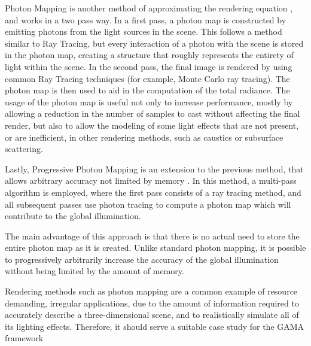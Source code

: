 Photon Mapping is another method of approximating the rendering equation \cite{jensen1996global}, and works in a two pass way.
In a first pass, a photon map is constructed by emitting photons from the light sources in the scene. This follows a method similar to Ray Tracing, but every interaction of a photon with the scene is stored in the photon map, creating a structure that roughly represents the entirety of light within the scene.
In the second pass, the final image is rendered by using common Ray Tracing techniques (for example, Monte Carlo ray tracing). The photon map is then used to aid in the computation of the total radiance.
The usage of the photon map is useful not only to increase performance, mostly by allowing a reduction in the number of samples to cast without affecting the final render, but also to allow the modeling of some light effects that are not present, or are inefficient, in other rendering methods, such as caustics or subsurface scattering.

Lastly, Progressive Photon Mapping is an extension to the previous method, that allows arbitrary accuracy not limited by memory \cite{hachisuka2008progressive}. In this method, a multi-pass algorithm is employed, where the first pass consists of a ray tracing method, and all subsequent passes use photon tracing to compute a photon map which will contribute to the global illumination.

The main advantage of this approach is that there is no actual need to store the entire photon map as it is created. Unlike standard photon mapping, it is possible to progressively arbitrarily increase the accuracy of the global illumination without being limited by the amount of memory.

Rendering methods such as photon mapping are a common example of resource demanding, irregular applications, due to the amount of information required to accurately describe a three-dimensional scene, and to realistically simulate all of its lighting effects. Therefore, it should serve a suitable case study for the GAMA framework
